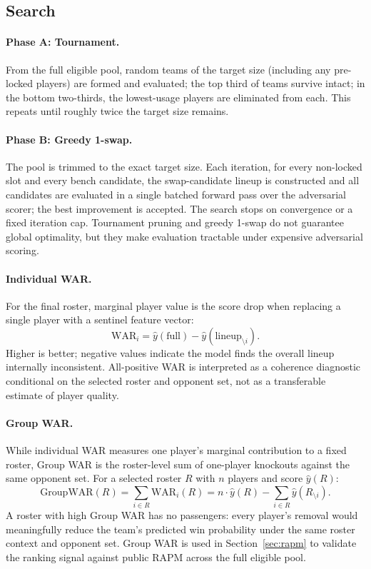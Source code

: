 \documentclass[12pt,letterpaper]{article}
\begin{document}
\subsection{Search}

\paragraph{Phase A: Tournament.}
From the full eligible pool, random teams of the target size (including
any pre-locked players) are formed and evaluated; the top third of
teams survive intact; in the bottom two-thirds, the lowest-usage
players are eliminated from each.
This repeats until roughly twice the target size remains.

\paragraph{Phase B: Greedy 1-swap.}
The pool is trimmed to the exact target size.
Each iteration, for every non-locked slot and every bench candidate,
the swap-candidate lineup is constructed and all candidates are
evaluated in a single batched forward pass over the adversarial scorer;
the best improvement is accepted.
The search stops on convergence or a fixed iteration cap.
Tournament pruning and greedy 1-swap do not guarantee global
optimality, but they make evaluation tractable under expensive
adversarial scoring.

\paragraph{Individual WAR.}
For the final roster, marginal player value is the score drop when
replacing a single player with a sentinel feature vector:
\begin{equation}
  \mathrm{WAR}_i = \hat{y}(\text{full})
    - \hat{y}(\text{lineup}_{\setminus i}).
  \label{eq:war}
\end{equation}
Higher is better; negative values indicate the model finds the overall
lineup internally inconsistent.
All-positive WAR is interpreted as a coherence diagnostic conditional
on the selected roster and opponent set, not as a transferable estimate
of player quality.

\paragraph{Group WAR.}
While individual WAR measures one player's marginal contribution to a
fixed roster, Group WAR is the roster-level sum of one-player knockouts
against the same opponent set.
For a selected roster $R$ with $n$ players and score $\hat{y}(R)$:
\begin{equation}
  \mathrm{GroupWAR}(R)
    = \sum_{i \in R} \mathrm{WAR}_i(R)
    = n\cdot\hat{y}(R) - \sum_{i \in R}\hat{y}(R_{\setminus i}).
  \label{eq:groupwar}
\end{equation}
A roster with high Group WAR has no passengers: every player's removal
would meaningfully reduce the team's predicted win probability under the
same roster context and opponent set.
Group WAR is used in Section~\ref{sec:rapm} to validate the ranking
signal against public RAPM across the full eligible pool.
\end{document}
